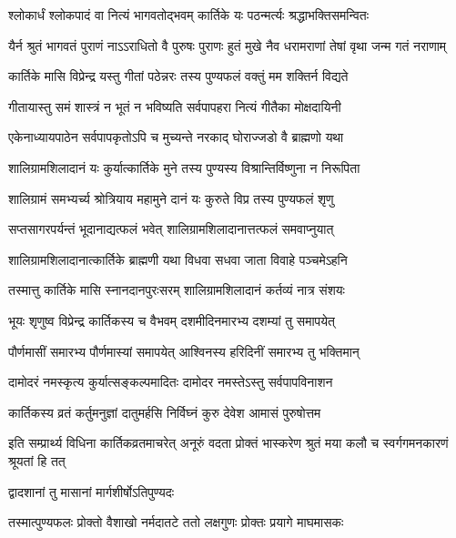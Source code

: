 \twolineshloka
{श्लोकार्धं श्लोकपादं वा नित्यं भागवतोद्भवम्}
{कार्तिके यः पठन्मर्त्यः श्रद्धाभक्तिसमन्वितः} %

\fourlineindentedshloka
{यैर्न श्रुतं भागवतं पुराणं}
{नाऽऽराधितो वै पुरुषः पुराणः}
{हुतं मुखे नैव धरामराणां}
{तेषां वृथा जन्म गतं नराणाम्} %

\twolineshloka
{कार्तिके मासि विप्रेन्द्र यस्तु गीतां पठेन्नरः}
{तस्य पुण्यफलं वक्तुं मम शक्तिर्न विद्यते} %

\twolineshloka
{गीतायास्तु समं शास्त्रं न भूतं न भविष्यति}
{सर्वपापहरा नित्यं गीतैका मोक्षदायिनी} %

\twolineshloka
{एकेनाध्यायपाठेन सर्वपापकृतोऽपि च}
{मुच्यन्ते नरकाद् घोराज्जडो वै ब्राह्मणो यथा} %

\twolineshloka
{शालिग्रामशिलादानं यः कुर्यात्कार्तिके मुने}
{तस्य पुण्यस्य विश्रान्तिर्विष्णुना न निरूपिता} %

\twolineshloka
{शालिग्रामं समभ्यर्च्य श्रोत्रियाय महामुने}
{दानं यः कुरुते विप्र तस्य पुण्यफलं शृणु} %

\twolineshloka
{सप्तसागरपर्यन्तं भूदानाद्यत्फलं भवेत्}
{शालिग्रामशिलादानात्तत्फलं समवाप्नुयात्} %

\twolineshloka
{शालिग्रामशिलादानात्कार्तिके ब्राह्मणी यथा}
{विधवा सधवा जाता विवाहे पञ्चमेऽहनि} %

\twolineshloka
{तस्मात्तु कार्तिके मासि स्नानदानपुरःसरम्}
{शालिग्रामशिलादानं कर्तव्यं नात्र संशयः} %





\twolineshloka
{भूयः शृणुष्व विप्रेन्द्र कार्तिकस्य च वैभवम्}
{दशमीदिनमारभ्य दशम्यां तु समापयेत्} %

\twolineshloka
{पौर्णमासीं समारभ्य पौर्णमास्यां समापयेत्}
{आश्विनस्य हरिदिनीं समारभ्य तु भक्तिमान्} %

\twolineshloka
{दामोदरं नमस्कृत्य कुर्यात्सङ्कल्पमादितः}
{दामोदर नमस्तेऽस्तु सर्वपापविनाशन} %

\twolineshloka
{कार्तिकस्य व्रतं कर्तुमनुज्ञां दातुमर्हसि}
{निर्विघ्नं कुरु देवेश आमासं पुरुषोत्तम} %

\threelineshloka
{इति सम्प्रार्थ्य विधिना कार्तिकव्रतमाचरेत्}
{अनूरुं वदता प्रोक्तं भास्करेण श्रुतं मया}
{कलौ च स्वर्गगमनकारणं श्रूयतां हि तत्} %



\onelineshloka
{द्वादशानां तु मासानां मार्गशीर्षोऽतिपुण्यदः} %

\twolineshloka
{तस्मात्पुण्यफलः प्रोक्तो वैशाखो नर्मदातटे}
{ततो लक्षगुणः प्रोक्तः प्रयागे माघमासकः} %

